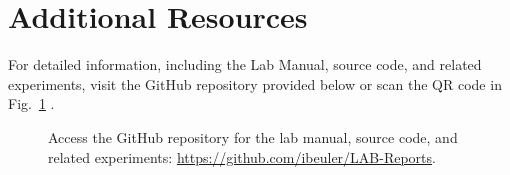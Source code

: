 \documentclass[journal]{IEEEtran}
\begin{document}
\section{Additional Resources}
For detailed information, including the Lab Manual, source code, and related experiments, visit the GitHub repository provided below or scan the QR code in Fig.~\ref{fig:qr_code} \cite{github}.

\begin{figure}[H]
    \centering
    \begin{minipage}{0.15\textwidth}
        \centering
    \end{minipage}%
    \begin{minipage}{0.2\textwidth}
        \raggedright
        \caption{Access the GitHub repository for the lab manual, source code, and related experiments: \href{https://github.com/ibeuler/LAB-Reports}{\url{https://github.com/ibeuler/LAB-Reports}}.}
        
        \label{fig:qr_code}
    \end{minipage}
\end{figure}



\end{document}
